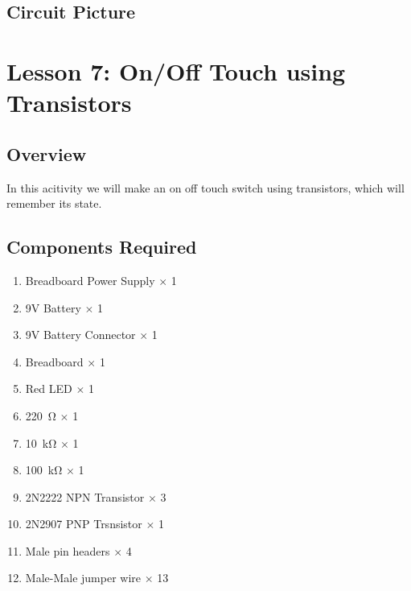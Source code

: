 \subsection{Circuit Picture}




\section{Lesson 7: On/Off Touch using Transistors}
\subsection{Overview}
In this acitivity we will make an on off touch switch using transistors, which will remember its state.
\subsection{Components Required}
\begin{enumerate}
    \item Breadboard Power Supply $\times$ 1
    \item 9V Battery $\times$ 1
    \item 9V Battery Connector $\times$ 1
    \item Breadboard $\times$ 1
    \item Red LED $\times$ 1
    \item \SI{220}{\ohm} $\times$ 1
    \item \SI{10}{\kilo\ohm} $\times$ 1
    \item \SI{100}{\kilo\ohm} $\times$ 1
    \item 2N2222 NPN Transistor $\times$ 3
    \item 2N2907 PNP Trsnsistor $\times$ 1
    \item Male pin headers $\times$ 4
    \item Male-Male jumper wire $\times$ 13
\end{enumerate}
